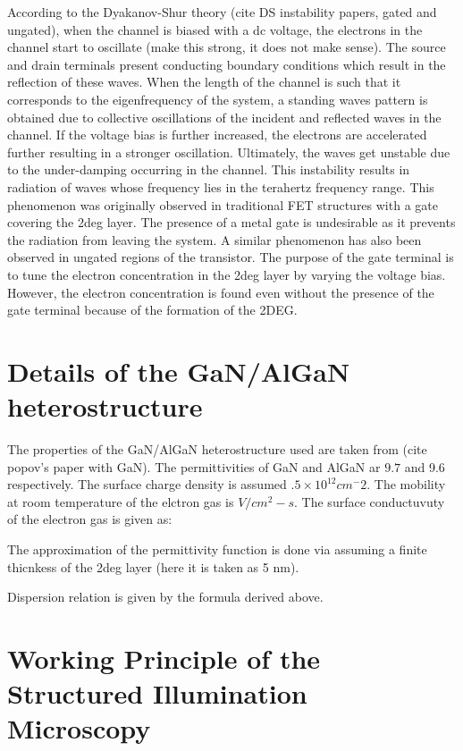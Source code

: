 \documentclass[11pt]{article}
\begin{document}
According to the Dyakanov-Shur theory (cite DS instability papers, gated and ungated), when the channel is biased with a dc voltage, the electrons in the channel start to oscillate (make this strong, it does not make sense). The source and drain terminals present conducting boundary conditions which result in the reflection of these waves. When the length of the channel is such that it corresponds to the eigenfrequency of the system, a standing waves pattern is obtained due to collective oscillations of the incident and reflected waves in the channel. If the voltage bias is further increased, the electrons are accelerated further resulting in a stronger oscillation. Ultimately, the waves get unstable due to the under-damping occurring in the channel. This instability results in radiation of waves whose frequency lies in the terahertz frequency range. This phenomenon was originally observed in traditional FET structures with a gate covering the 2deg layer. The presence of a metal gate is undesirable as it prevents the radiation from leaving the system. A similar phenomenon has also been observed in ungated regions of the transistor. The purpose of the gate terminal is to tune the electron concentration in the 2deg layer by varying the voltage bias. However, the electron concentration is found even without the presence of the gate terminal because of the formation of the 2DEG.

\section{Details of the GaN/AlGaN heterostructure}

The properties of the GaN/AlGaN heterostructure used are taken from (cite popov's paper with GaN). The permittivities of GaN and AlGaN ar $9.7$ and 9.6 respectively. The surface charge density is assumed $.5 \times 10^12 cm^-2$. The mobility at room temperature of the elctron gas is  $V/cm^2-s$. The surface conductuvuty of the electron gas is given as:


The approximation of the permittivity function is done via assuming a finite thicnkess of the 2deg layer (here it is taken as 5 nm).

Dispersion relation is given by the formula derived above.

\section{Working Principle of the Structured Illumination Microscopy}
\end{document}
